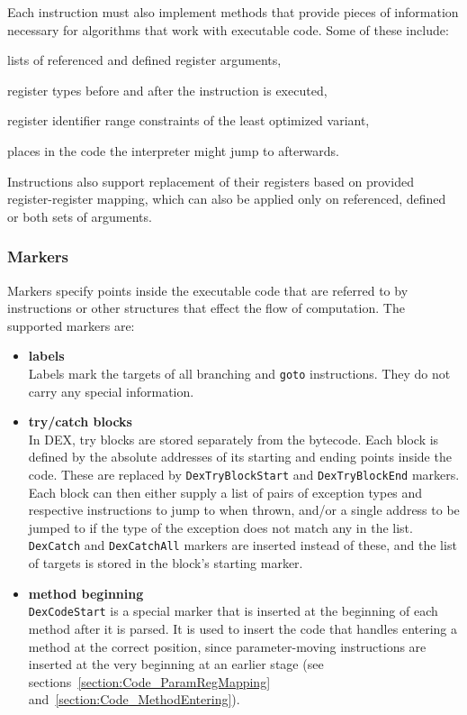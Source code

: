 \documentclass[12pt,twoside,notitlepage]{report}
\begin{document}
Each instruction must also implement methods that provide pieces of information necessary for algorithms that work with executable code. Some of these include:
\begin{inparaenum}[(i)]
\item lists of referenced and defined register arguments,
\item register types before and after the instruction is executed,
\item register identifier range constraints of the least optimized variant,
\item places in the code the interpreter might jump to afterwards.
\end{inparaenum}
Instructions also support replacement of their registers based on provided register-register mapping, which can also be applied only on referenced, defined or both sets of arguments.

\subsubsection{Markers}

Markers specify points inside the executable code that are referred to by instructions or other structures that effect the flow of computation. The supported markers are:
\begin{itemize}
\item \textbf{labels} \\
Labels mark the targets of all branching and \verb$goto$ instructions. They do not carry any special information.
\item \textbf{try/catch blocks} \\
In DEX, try blocks are stored separately from the bytecode. Each block is defined by the absolute addresses of its starting and ending points inside the code. These are replaced by \verb$DexTryBlockStart$ and \verb$DexTryBlockEnd$ markers. Each block can then either supply a list of pairs of exception types and respective instructions to jump to when thrown, and/or a single address to be jumped to if the type of the exception does not match any in the list. \verb$DexCatch$ and \verb$DexCatchAll$ markers are inserted instead of these, and the list of targets is stored in the block's starting marker. 
\item \textbf{method beginning} \\
\verb$DexCodeStart$ is a special marker that is inserted at the beginning of each method after it is parsed. It is used to insert the code that handles entering a method at the correct position, since parameter-moving instructions are inserted at the very beginning at an earlier stage (see sections~\ref{section:Code_ParamRegMapping} and~\ref{section:Code_MethodEntering}).

\end{itemize}
\end{document}
